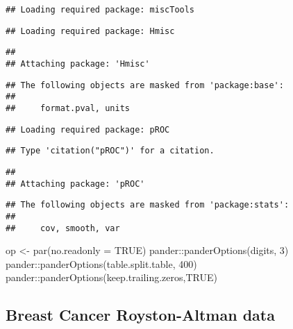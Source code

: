 \documentclass[
]{article}
\newenvironment{Shaded}{\begin{snugshade}}{\end{snugshade}}
\newcommand{\AttributeTok}[1]{\textcolor[rgb]{0.77,0.63,0.00}{#1}}
\newcommand{\ConstantTok}[1]{\textcolor[rgb]{0.00,0.00,0.00}{#1}}
\newcommand{\DecValTok}[1]{\textcolor[rgb]{0.00,0.00,0.81}{#1}}
\newcommand{\FunctionTok}[1]{\textcolor[rgb]{0.00,0.00,0.00}{#1}}
\newcommand{\NormalTok}[1]{#1}
\newcommand{\OtherTok}[1]{\textcolor[rgb]{0.56,0.35,0.01}{#1}}
\newcommand{\SpecialCharTok}[1]{\textcolor[rgb]{0.00,0.00,0.00}{#1}}
\newcommand{\StringTok}[1]{\textcolor[rgb]{0.31,0.60,0.02}{#1}}
\begin{document}
\begin{verbatim}
## Loading required package: miscTools
\end{verbatim}

\begin{verbatim}
## Loading required package: Hmisc
\end{verbatim}

\begin{verbatim}
## 
## Attaching package: 'Hmisc'
\end{verbatim}

\begin{verbatim}
## The following objects are masked from 'package:base':
## 
##     format.pval, units
\end{verbatim}

\begin{verbatim}
## Loading required package: pROC
\end{verbatim}

\begin{verbatim}
## Type 'citation("pROC")' for a citation.
\end{verbatim}

\begin{verbatim}
## 
## Attaching package: 'pROC'
\end{verbatim}

\begin{verbatim}
## The following objects are masked from 'package:stats':
## 
##     cov, smooth, var
\end{verbatim}

\begin{Shaded}
\begin{Highlighting}[]
\NormalTok{op }\OtherTok{\textless{}{-}} \FunctionTok{par}\NormalTok{(}\AttributeTok{no.readonly =} \ConstantTok{TRUE}\NormalTok{)}
\NormalTok{pander}\SpecialCharTok{::}\FunctionTok{panderOptions}\NormalTok{(}\StringTok{\textquotesingle{}digits\textquotesingle{}}\NormalTok{, }\DecValTok{3}\NormalTok{)}
\NormalTok{pander}\SpecialCharTok{::}\FunctionTok{panderOptions}\NormalTok{(}\StringTok{\textquotesingle{}table.split.table\textquotesingle{}}\NormalTok{, }\DecValTok{400}\NormalTok{)}
\NormalTok{pander}\SpecialCharTok{::}\FunctionTok{panderOptions}\NormalTok{(}\StringTok{\textquotesingle{}keep.trailing.zeros\textquotesingle{}}\NormalTok{,}\ConstantTok{TRUE}\NormalTok{)}
\end{Highlighting}
\end{Shaded}

\hypertarget{breast-cancer-royston-altman-data}{%
\subsection{Breast Cancer Royston-Altman
data}\label{breast-cancer-royston-altman-data}}
\end{document}

